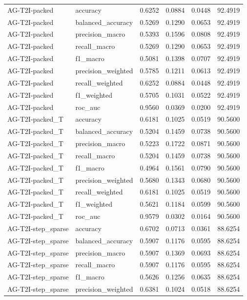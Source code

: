 \begin{tabular}{llrrrr}
AG-T2I-packed & accuracy & 0.6252 & 0.0884 & 0.0448 & 92.4919 \\
AG-T2I-packed & balanced_accuracy & 0.5269 & 0.1290 & 0.0653 & 92.4919 \\
AG-T2I-packed & precision_macro & 0.5393 & 0.1596 & 0.0808 & 92.4919 \\
AG-T2I-packed & recall_macro & 0.5269 & 0.1290 & 0.0653 & 92.4919 \\
AG-T2I-packed & f1_macro & 0.5081 & 0.1398 & 0.0707 & 92.4919 \\
AG-T2I-packed & precision_weighted & 0.5785 & 0.1211 & 0.0613 & 92.4919 \\
AG-T2I-packed & recall_weighted & 0.6252 & 0.0884 & 0.0448 & 92.4919 \\
AG-T2I-packed & f1_weighted & 0.5705 & 0.1031 & 0.0522 & 92.4919 \\
AG-T2I-packed & roc_auc & 0.9560 & 0.0369 & 0.0200 & 92.4919 \\
AG-T2I-packed_T & accuracy & 0.6181 & 0.1025 & 0.0519 & 90.5600 \\
AG-T2I-packed_T & balanced_accuracy & 0.5204 & 0.1459 & 0.0738 & 90.5600 \\
AG-T2I-packed_T & precision_macro & 0.5223 & 0.1722 & 0.0871 & 90.5600 \\
AG-T2I-packed_T & recall_macro & 0.5204 & 0.1459 & 0.0738 & 90.5600 \\
AG-T2I-packed_T & f1_macro & 0.4964 & 0.1561 & 0.0790 & 90.5600 \\
AG-T2I-packed_T & precision_weighted & 0.5680 & 0.1343 & 0.0680 & 90.5600 \\
AG-T2I-packed_T & recall_weighted & 0.6181 & 0.1025 & 0.0519 & 90.5600 \\
AG-T2I-packed_T & f1_weighted & 0.5621 & 0.1184 & 0.0599 & 90.5600 \\
AG-T2I-packed_T & roc_auc & 0.9579 & 0.0302 & 0.0164 & 90.5600 \\
AG-T2I-step_sparse & accuracy & 0.6702 & 0.0713 & 0.0361 & 88.6254 \\
AG-T2I-step_sparse & balanced_accuracy & 0.5907 & 0.1176 & 0.0595 & 88.6254 \\
AG-T2I-step_sparse & precision_macro & 0.5907 & 0.1369 & 0.0693 & 88.6254 \\
AG-T2I-step_sparse & recall_macro & 0.5907 & 0.1176 & 0.0595 & 88.6254 \\
AG-T2I-step_sparse & f1_macro & 0.5626 & 0.1256 & 0.0635 & 88.6254 \\
AG-T2I-step_sparse & precision_weighted & 0.6381 & 0.1024 & 0.0518 & 88.6254 \\

\end{tabular}

